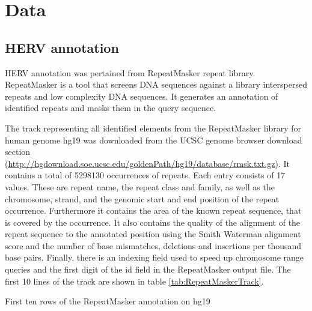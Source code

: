\documentclass[a4paper,12pt]{article}
\begin{document}
\newpage
\section{Data}


\subsection{HERV annotation}
HERV annotation was pertained from RepeatMasker\cite{RepeatMasker} repeat library. RepeatMasker is a tool that screens DNA sequences against a library interspersed repeats and low complexity DNA sequences. It generates an annotation of identified repeats and masks them in the query sequence.

The track representing all identified elements from the RepeatMasker library for human genome hg19 was downloaded from the UCSC genome browser download section \url{(http://hgdownload.soe.ucsc.edu/goldenPath/hg19/database/rmsk.txt.gz)}. It contains a total of 5298130 occurrences of repeats. Each entry consists of 17 values. These are repeat name, the repeat class and family, as well as the chromosome, strand, and the genomic start and end position of the repeat occurrence. Furthermore it contains the area of the known repeat sequence, that is covered by the occurrence. It also contains the quality of the alignment of the repeat sequence to the annotated position using the Smith Waterman alignment score\cite{SMITH1981195} and the number of base mismatches, deletions and insertions per thousand base pairs. Finally, there is an indexing field used to speed up chromosome range queries and the first digit of the id field in the RepeatMasker output file. The first 10 lines of the track are shown in table \ref{tab:RepeatMaskerTrack}.

\begin{table}[b]
\centering
\label{tab:RepeatMaskerTrack}
\caption{First ten rows of the RepeatMasker annotation on hg19}
\end{table}
\end{document}
